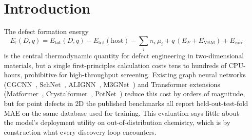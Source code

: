 \documentclass[11pt,a4paper]{article}
\begin{document}
\section{Introduction}\label{sec:intro}

The defect formation energy
\begin{equation}
E_{\mathrm{f}}(D, q) = E_{\mathrm{tot}}(D, q) - E_{\mathrm{tot}}(\mathrm{host})
- \sum_i n_i\,\mu_i + q\,(E_F + E_{\mathrm{VBM}}) + E_{\mathrm{corr}}
\label{eq:Ef}
\end{equation}
is the central thermodynamic quantity for defect engineering in
two-dimensional materials, but a single first-principles
calculation costs tens to hundreds of CPU-hours, prohibitive for
high-throughput screening. Existing graph neural networks
(CGCNN~\cite{Xie2018CGCNN}, SchNet~\cite{Schutt2018SchNet},
ALIGNN~\cite{Choudhary2021ALIGNN}, M3GNet~\cite{Chen2022M3GNet})
and Transformer extensions (Matformer~\cite{Yan2022Matformer},
Crystalformer~\cite{Taniai2024Crystalformer},
PotNet~\cite{Lin2023PotNet}) reduce this cost by orders of magnitude,
but for point defects in 2D the published benchmarks all report
held-out-test-fold MAE on the same database used for training. This
evaluation says little about the model's deployment utility on
out-of-distribution chemistry, which is by construction what every
discovery loop encounters.
\end{document}
